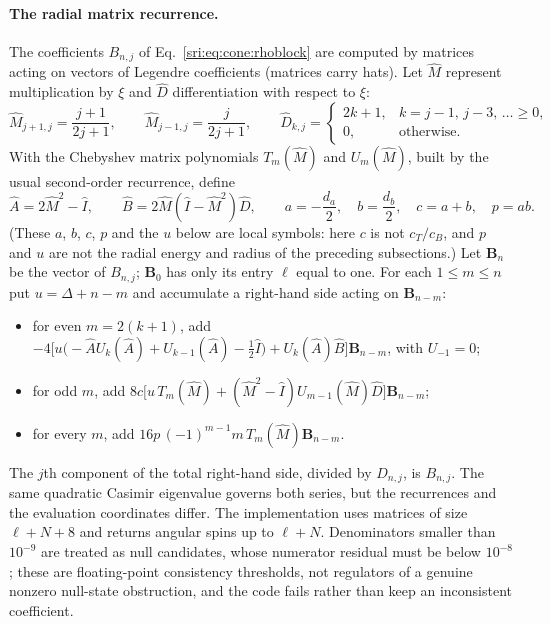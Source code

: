 \paragraph{The radial matrix recurrence.} The coefficients $B_{n,j}$ of Eq.~\eqref{sri:eq:cone:rhoblock} are computed by
matrices acting on vectors of Legendre coefficients (matrices carry hats). Let $\hat M$ represent multiplication by
$\xi$ and $\hat D$ differentiation with respect to $\xi$:
\begin{equation}
 \hat M_{j+1,j}=\frac{j+1}{2j+1},\qquad \hat M_{j-1,j}=\frac{j}{2j+1},\qquad
 \hat D_{k,j}=\begin{cases}2k+1,&k=j-1,\,j-3,\,\dots\ge0,\\0,&\text{otherwise}.\end{cases}
\end{equation}
With the Chebyshev matrix polynomials $T_m(\hat M)$ and $U_m(\hat M)$, built by the usual second-order recurrence,
define
\begin{equation}
 \hat A=2\hat M^2-\hat I,\qquad \hat B=2\hat M(\hat I-\hat M^2)\hat D,\qquad
 a=-\frac{d_a}2,\quad b=\frac{d_b}2,\quad c=a+b,\quad p=ab .
\end{equation}
(These $a$, $b$, $c$, $p$ and the $u$ below are local symbols: here $c$ is not $c_T/c_B$, and $p$ and $u$ are not
the radial energy and radius of the preceding subsections.) Let $\boldsymbol B_n$ be the vector of $B_{n,j}$;
$\boldsymbol B_0$ has only its entry $\ell$ equal to one. For each
$1\le m\le n$ put $u=\Delta+n-m$ and accumulate a right-hand side acting on $\boldsymbol B_{n-m}$:
\begin{itemize}
\item for even $m=2(k+1)$, add $-4\bigl[u\bigl(-\hat AU_k(\hat A)+U_{k-1}(\hat A)-\tfrac12\hat I\bigr)+U_k(\hat A)\hat B\bigr]\boldsymbol B_{n-m}$,
 with $U_{-1}=0$;
\item for odd $m$, add $8c\bigl[u\,T_m(\hat M)+(\hat M^2-\hat I)U_{m-1}(\hat M)\hat D\bigr]\boldsymbol B_{n-m}$;
\item for every $m$, add $16p\,(-1)^{m-1}m\,T_m(\hat M)\boldsymbol B_{n-m}$.
\end{itemize}
The $j$th component of the total right-hand side, divided by $D_{n,j}$, is $B_{n,j}$. The same quadratic Casimir
eigenvalue governs both series, but the recurrences and the evaluation coordinates differ. The implementation uses
matrices of size $\ell+N+8$ and returns angular spins up to $\ell+N$. Denominators smaller than $10^{-9}$ are treated as
null candidates, whose numerator residual must be below $10^{-8}$; these are floating-point consistency thresholds, not
regulators of a genuine nonzero null-state obstruction, and the code fails rather than keep an inconsistent
coefficient.

